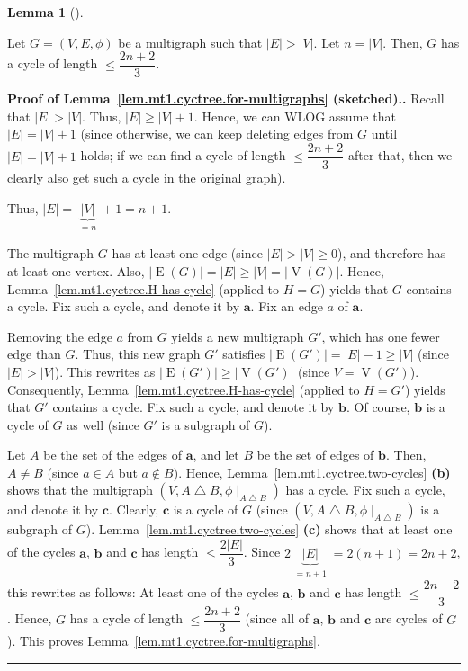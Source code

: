 \documentclass[numbers=enddot,12pt,final,onecolumn,notitlepage]{scrartcl}%
\theoremstyle{definition}
\newtheorem{lem}[theo]{Lemma}
\newenvironment{lemma}[1][]
{\begin{lem}[#1]\begin{leftbar}}
{\end{leftbar}\end{lem}}
\newenvironment{proof}[1][Proof]{\noindent\textbf{#1.} }{\ \rule{0.5em}{0.5em}}
\newcommand{\abs}[1]{\left| #1 \right|}
\newcommand{\tup}[1]{\left( #1 \right)}
\newcommand{\verts}[1]{\operatorname{V}\left( #1 \right)}
\newcommand{\edges}[1]{\operatorname{E}\left( #1 \right)}
\newcommand{\underbrack}[2]{\underbrace{#1}_{\substack{#2}}}
\begin{document}
\begin{lemma} \label{lem.mt1.cyctree.for-multigraphs}
Let $G = \tup{V, E, \phi}$ be a multigraph such that
$\abs{E} > \abs{V}$. Let $n = \abs{V}$. Then,
$G$ has a cycle of length $\leq \dfrac{2n+2}{3}$.
\end{lemma}

\begin{proof}[Proof of Lemma~\ref{lem.mt1.cyctree.for-multigraphs}
(sketched).]
Recall that $\abs{E} > \abs{V}$. Thus,
$\abs{E} \geq \abs{V} + 1$. Hence, we can WLOG assume that
$\abs{E} = \abs{V} + 1$ (since otherwise, we can keep deleting edges
from $G$ until $\abs{E} = \abs{V} + 1$ holds; if we can find a cycle
of length $\leq \dfrac{2n+2}{3}$ after that, then we clearly also get
such a cycle in the original graph).

Thus, $\abs{E} = \underbrack{\abs{V}}{= n} + 1 = n+1$.

The multigraph $G$ has at least one edge (since $\abs{E} > \abs{V}
\geq 0$), and therefore has at least one vertex. Also,
$\abs{\edges{G}} = \abs{E} \geq \abs{V} = \abs{\verts{G}}$.
Hence, Lemma~\ref{lem.mt1.cyctree.H-has-cycle}
(applied to $H = G$) yields that $G$ contains a
cycle. Fix such a cycle, and denote it by $\mathbf{a}$.
Fix an edge $a$ of $\mathbf{a}$.

Removing the edge $a$ from $G$ yields a new multigraph $G'$, which
has one fewer edge than $G$. Thus, this new graph $G'$ satisfies
$\abs{\edges{G'}} = \abs{E} - 1 \geq \abs{V}$ (since $\abs{E} >
\abs{V}$). This rewrites as
$\abs{\edges{G'}} \geq \abs{\verts{G'}}$
(since $V = \verts{G'}$).
Consequently, Lemma~\ref{lem.mt1.cyctree.H-has-cycle}
(applied to $H = G'$) yields that $G'$
contains a cycle. Fix such a cycle, and denote it by $\mathbf{b}$.
Of course, $\mathbf{b}$ is a cycle of $G$ as well (since $G'$ is a
subgraph of $G$).

Let $A$ be the set of the edges of $\mathbf{a}$, and let $B$ be the
set of edges of $\mathbf{b}$. Then, $A \neq B$ (since
$a \in A$ but $a \notin B$). Hence,
Lemma~\ref{lem.mt1.cyctree.two-cycles} \textbf{(b)} shows that the
multigraph
$\tup{V, A \bigtriangleup B, \phi\mid_{A \bigtriangleup B}}$
has a cycle. Fix such a
cycle, and denote it by $\mathbf{c}$. Clearly, $\mathbf{c}$ is a cycle
of $G$ (since
$\tup{V, A \bigtriangleup B, \phi\mid_{A \bigtriangleup B}}$ is a
subgraph of $G$).
Lemma~\ref{lem.mt1.cyctree.two-cycles} \textbf{(c)} shows that
at least one of the cycles $\mathbf{a}$, $\mathbf{b}$ and
$\mathbf{c}$ has length $\leq \dfrac{2 \abs{E}}{3}$.
Since $2 \underbrack{\abs{E}}{= n+1} = 2 \tup{n+1} = 2n+2$, this
rewrites as follows: At least
one of the cycles $\mathbf{a}$, $\mathbf{b}$ and
$\mathbf{c}$ has length $\leq \dfrac{2n + 2}{3}$. Hence, $G$ has a
cycle of length $\leq \dfrac{2n + 2}{3}$ (since all of
$\mathbf{a}$, $\mathbf{b}$ and $\mathbf{c}$ are cycles of $G$).
This proves Lemma~\ref{lem.mt1.cyctree.for-multigraphs}.
\end{proof}
\end{document}
